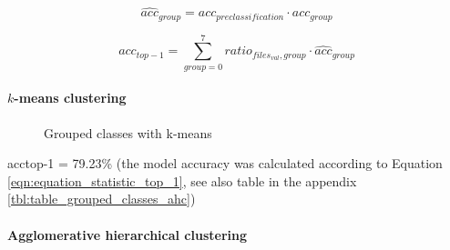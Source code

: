 \documentclass[10pt]{article}
\newcommand\inputpgf[2]{{
\let\pgfimageWithoutPath\pgfimage
\renewcommand{\pgfimage}[2][]{\pgfimageWithoutPath[##1]{#1/##2}}

}}
\newif\ifen
\newif\ifde
\newcommand{\en}[1]{\ifen#1\fi}
\newcommand{\de}[1]{\ifde#1\fi}
\begin{document}
					\de{Wie erwartet kann man nun sofort ähnliche Klassen erkennen: Getränke (orange), Kuchen (blau) und Salate (grün). In den nachfolgenden beiden Kapiteln werden die Modellgenauigkeiten für die Vorklassifizierung als auch die Unterklassen wie üblich bestimmt. Um die Gesamtgenauigkeit der Modelle bestimmen zu können, müsste dies manuell einzeln geschehen, da eine Klassifizierung mittels Untergruppen nicht vorgesehen ist. Stattdessen wird die Gesamtgenauigkeit statistisch vorgenommen.}
					\en{As expected, one can now immediately recognize similar classes: drinks (orange), cakes (blue) and salads (green). In the following two chapters, the model accuracies for the pre-classification as well as the subclasses are determined as usual. In order to determine the overall accuracy of the models, this would have to be done manually one at a time, since classification using subgroups is not intended. Instead, the overall accuracy is determined statistically:}
					
					\begin{equation}
						\widehat{acc}_{group} = acc_{preclassification} \cdot acc_{group}
					\end{equation}
					
					\begin{equation}
						acc_{top-1} = \sum_{group=0}^7 ratio_{files_{val}, group} \cdot \widehat{acc}_{group}
						\label{eqn:equation_statistic_top_1}
					\end{equation}
					
					\paragraph{\(k\)-means clustering}
				
						\begin{figure}[H]
							\begin{center}
								\scalebox{0.5}{
									\inputpgf{images/pgf}{pca-grouped.pgf}
								}
							\end{center}
							\caption{Grouped classes with k-means}
							\label{fig:analysis_grouped_classes_with_k_means}
						\end{figure}
						
						acctop-1 = 79.23\% (the model accuracy was calculated according to Equation \eqref{eqn:equation_statistic_top_1}, see also table in the appendix \ref{tbl:table_grouped_classes_ahc})
					
					\paragraph{Agglomerative hierarchical clustering}
					
\end{document}
